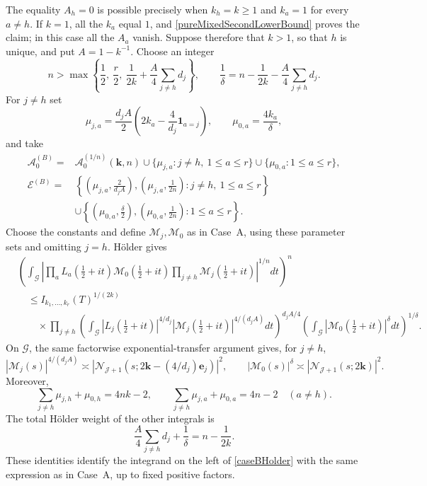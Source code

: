 \documentclass[oneside, 12pt]{amsart}
\theoremstyle{definition}
\begin{document}
{		The equality $A_h=0$ is possible precisely when $k_h=k\geq1$ and
		$k_a=1$ for every $a\neq h$.  If
		$k=1$, all the
		$k_a$ equal $1$, and \eqref{pureMixedSecondLowerBound} proves the
		claim; in this case all the $A_a$ vanish.  Suppose therefore that
		$k>1$, so that $h$ is unique, and put $A=1-k^{-1}$.  Choose an integer
		\[
		n>\max\left\{\frac12,\ \frac r2,\
		\frac1{2k}+\frac A4\sum_{j\neq h}d_j\right\},
		\qquad
		\frac1\delta=n-\frac1{2k}-
		\frac A4\sum_{j\neq h}d_j.
		\]
		For $j\neq h$ set
		\[
		\mu_{j,a}=\frac{d_jA}{2}
		\left(2k_a-\frac4{d_j}\mathbf1_{a=j}\right),
		\qquad
		\mu_{0,a}=\frac{4k_a}{\delta},
		\]
		and take
		\begin{align*}
			\mathscr A_0^{(B)}={}&
			\mathscr A_0^{(1/n)}(\boldsymbol k,n)
			\cup\{\mu_{j,a}:j\neq h,\ 1\leq a\leq r\}
			\cup\{\mu_{0,a}:1\leq a\leq r\},\\
			\mathscr E^{(B)}={}&
			\left\{\left(\mu_{j,a},\frac{2}{d_jA}\right),
			\left(\mu_{j,a},\frac1{2n}\right):j\neq h,\ 1\leq a\leq r\right\}\\
			&\cup\left\{\left(\mu_{0,a},\frac\delta2\right),
			\left(\mu_{0,a},\frac1{2n}\right):1\leq a\leq r\right\}.
		\end{align*}
		Choose the constants and define $\mathcal M_j,\mathcal M_0$ as in
		Case~A, using these parameter sets and omitting $j=h$.  H\"older gives
		\begin{align}
			&\left(\int_{\mathscr G}
			\left|\prod_aL_a(\tfrac12+it)
			\mathcal M_0(\tfrac12+it)
			\prod_{j\neq h}\mathcal M_j(\tfrac12+it)
			\right|^{1/n}dt\right)^n\nonumber\\
			&\quad\leq I_{k_1,\ldots,k_r}(T)^{1/(2k)}\nonumber\\[-1mm]
			&\qquad\times\prod_{j\neq h}\left(
			\int_{\mathscr G}|L_j(\tfrac12+it)|^{4/d_j}
			|\mathcal M_j(\tfrac12+it)|^{4/(d_jA)}dt
			\right)^{d_jA/4}
			\left(\int_{\mathscr G}
			|\mathcal M_0(\tfrac12+it)|^\delta dt\right)^{1/\delta}.
			\label{caseBHolder}
		\end{align}
		On $\mathscr G$, the same factorwise exponential-transfer argument gives,
		for $j\ne h$,
		\[
		|\mathcal M_j(s)|^{4/(d_jA)}\asymp
		|\mathcal N_{\mathscr J+1}
		(s;2\boldsymbol k-(4/d_j)\boldsymbol e_j)|^2,
		\qquad
		|\mathcal M_0(s)|^\delta\asymp
		|\mathcal N_{\mathscr J+1}(s;2\boldsymbol k)|^2.
		\]
		Moreover,
		\[
		\sum_{j\neq h}\mu_{j,h}+\mu_{0,h}=4nk-2,
		\qquad
		\sum_{j\neq h}\mu_{j,a}+\mu_{0,a}=4n-2\quad(a\neq h).
		\]
		The total H\"older weight of the other integrals is
		\[
		\frac A4\sum_{j\neq h}d_j+\frac1\delta
		=n-\frac1{2k}.
		\]
		These identities identify the integrand on the left of
		\eqref{caseBHolder} with the same expression as in Case~A, up to
		fixed positive factors.
		
}
\end{document}
